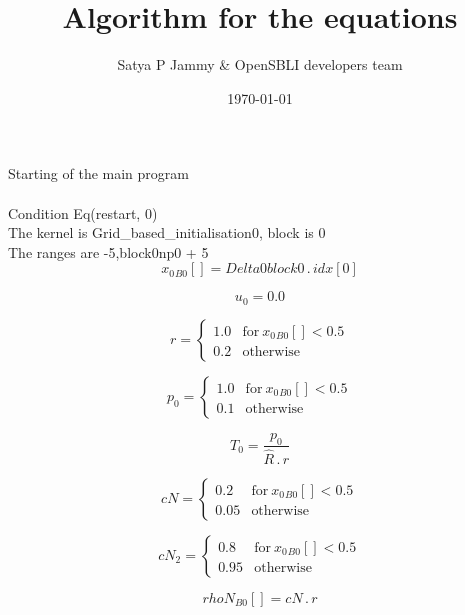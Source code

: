 \documentclass{article}
\title{Algorithm for the equations}
\author{Satya P Jammy \& OpenSBLI developers team}
\date{\today}
\begin{document}
\maketitle
\noindent Starting of the main program\\
\\\noindent Condition Eq(restart, 0)\\\noindent The kernel is Grid_based_initialisation0, block is 0\\\noindent The ranges are -5,block0np0 + 5\\\begin{dmath}{x_{0}{_{B0}}}[{}] = Delta0block0 \,.\, {idx}[{0}]\end{dmath}

\begin{dmath}u_{0} = 0.0\end{dmath}

\begin{dmath}r = \begin{cases} 1.0 & \text{for}\: {x_{0}{_{B0}}}[{}] < 0.5 \\0.2 & \text{otherwise} \end{cases}\end{dmath}

\begin{dmath}p_{0} = \begin{cases} 1.0 & \text{for}\: {x_{0}{_{B0}}}[{}] < 0.5 \\0.1 & \text{otherwise} \end{cases}\end{dmath}

\begin{dmath}T_{0} = \frac{p_{0}}{\hat{R} \,.\, r}\end{dmath}

\begin{dmath}cN = \begin{cases} 0.2 & \text{for}\: {x_{0}{_{B0}}}[{}] < 0.5 \\0.05 & \text{otherwise} \end{cases}\end{dmath}

\begin{dmath}cN_{2} = \begin{cases} 0.8 & \text{for}\: {x_{0}{_{B0}}}[{}] < 0.5 \\0.95 & \text{otherwise} \end{cases}\end{dmath}

\begin{dmath}{rhoN{_{B0}}}[{}] = cN \,.\, r\end{dmath}
\end{document}
